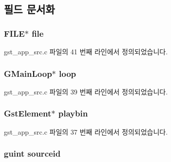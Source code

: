 \subsection{필드 문서화}
\subsubsection[{\texorpdfstring{file}{file}}]{\setlength{\rightskip}{0pt plus 5cm}F\+I\+LE$\ast$ file}\hypertarget{structgst__app__t_a702945180aa732857b380a007a7e2a21}{}\label{structgst__app__t_a702945180aa732857b380a007a7e2a21}


gst\+\_\+app\+\_\+src.\+c 파일의 41 번째 라인에서 정의되었습니다.

\subsubsection[{\texorpdfstring{loop}{loop}}]{\setlength{\rightskip}{0pt plus 5cm}G\+Main\+Loop$\ast$ loop}\hypertarget{structgst__app__t_a35126dd286141bc2cc1f045de5e1f81a}{}\label{structgst__app__t_a35126dd286141bc2cc1f045de5e1f81a}


gst\+\_\+app\+\_\+src.\+c 파일의 39 번째 라인에서 정의되었습니다.

\subsubsection[{\texorpdfstring{playbin}{playbin}}]{\setlength{\rightskip}{0pt plus 5cm}Gst\+Element$\ast$ playbin}\hypertarget{structgst__app__t_aa5d064c9e5e4066bfce7b7f40ba31f5d}{}\label{structgst__app__t_aa5d064c9e5e4066bfce7b7f40ba31f5d}


gst\+\_\+app\+\_\+src.\+c 파일의 37 번째 라인에서 정의되었습니다.

\subsubsection[{\texorpdfstring{sourceid}{sourceid}}]{\setlength{\rightskip}{0pt plus 5cm}guint sourceid}\hypertarget{structgst__app__t_af1aa180762d2e3eab179a2ac3b90be79}{}\label{structgst__app__t_af1aa180762d2e3eab179a2ac3b90be79}


